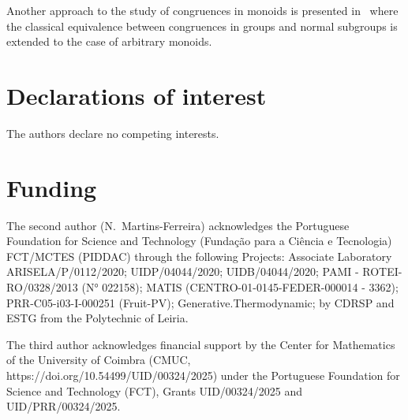 \documentclass[12pt]{article}
\begin{document}
 Another approach to the study of congruences in monoids is presented in~\cite{Elgueta} where the classical equivalence between congruences in groups and normal subgroups is extended to the case of arbitrary monoids.

\section*{Declarations of interest}

The authors declare no competing interests.

\section*{Funding}
The second author (N.~Martins-Ferreira) acknowledges the Portuguese Foundation for Science and Technology (Fundação para a Ciência e Tecnologia) FCT/MCTES (PIDDAC) through the following Projects: Associate Laboratory ARISELA/P/0112/2020; UIDP/04044/2020; UIDB/04044/2020; PAMI - ROTEI-
RO/0328/2013 (N° 022158); MATIS (CENTRO-01-0145-FEDER-000014 - 3362); PRR-C05-i03-I-000251 (Fruit-PV); Generative.Thermodynamic; by CDRSP and ESTG from the Polytechnic of Leiria.

The third author acknowledges financial support by the Center for Mathematics of the University of Coimbra (CMUC, https://doi.org/10.54499/UID/00324/2025) under the Portuguese Foundation for Science and Technology (FCT), Grants UID/00324/2025 and UID/PRR/00324/2025.
\end{document}
